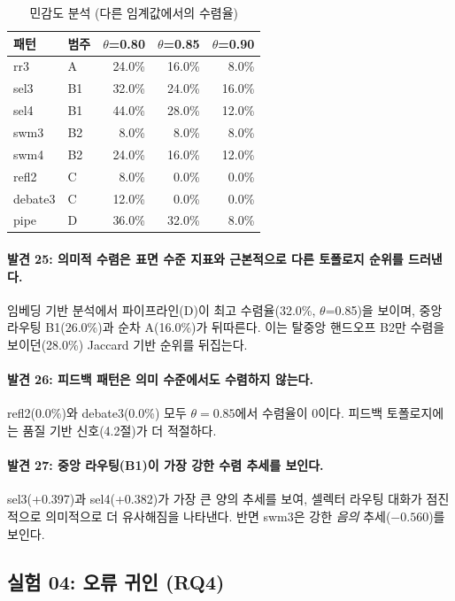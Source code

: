 \begin{table}[H]
\centering
\caption{민감도 분석 (다른 임계값에서의 수렴율)}
\label{tab:sensitivity-theta}
{\small
\begin{tabular}{llrrr}
\toprule
패턴 & 범주 & $\theta$=0.80 & $\theta$=0.85 & $\theta$=0.90 \\
\midrule
rr3     & A  & 24.0\% & 16.0\% & 8.0\% \\
sel3    & B1 & 32.0\% & 24.0\% & 16.0\% \\
sel4    & B1 & 44.0\% & 28.0\% & 12.0\% \\
swm3    & B2 & 8.0\%  & 8.0\%  & 8.0\% \\
swm4    & B2 & 24.0\% & 16.0\% & 12.0\% \\
refl2   & C  & 8.0\%  & 0.0\%  & 0.0\% \\
debate3 & C  & 12.0\% & 0.0\%  & 0.0\% \\
pipe    & D  & 36.0\% & 32.0\% & 8.0\% \\
\bottomrule
\end{tabular}
}
\end{table}

\paragraph{발견 25: 의미적 수렴은 표면 수준 지표와 근본적으로 다른 토폴로지 순위를 드러낸다.}
임베딩 기반 분석에서 파이프라인(D)이 최고 수렴율(32.0\%, $\theta$=0.85)을 보이며, 중앙 라우팅 B1(26.0\%)과 순차 A(16.0\%)가 뒤따른다. 이는 탈중앙 핸드오프 B2만 수렴을 보이던(28.0\%) Jaccard 기반 순위를 뒤집는다.

\paragraph{발견 26: 피드백 패턴은 의미 수준에서도 수렴하지 않는다.}
refl2(0.0\%)와 debate3(0.0\%) 모두 $\theta=0.85$에서 수렴율이 0이다. 피드백 토폴로지에는 품질 기반 신호(4.2절)가 더 적절하다.

\paragraph{발견 27: 중앙 라우팅(B1)이 가장 강한 수렴 추세를 보인다.}
sel3(+0.397)과 sel4(+0.382)가 가장 큰 양의 추세를 보여, 셀렉터 라우팅 대화가 점진적으로 의미적으로 더 유사해짐을 나타낸다. 반면 swm3은 강한 \emph{음의} 추세($-0.560$)를 보인다.

\subsection{실험 04: 오류 귀인 (RQ4)}
\label{sec:exp04}


